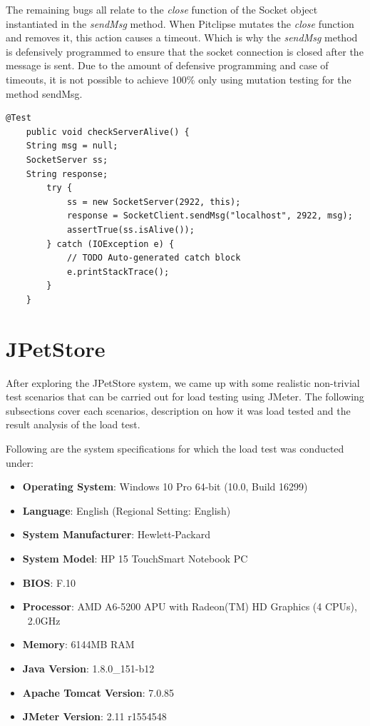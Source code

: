 \documentclass[fontsize=12pt,paper=letter,twoside]{scrartcl}
\begin{document}
The remaining bugs all relate to the \emph{close} function of the Socket object instantiated in the \emph{sendMsg} method. When Pitclipse mutates the \emph{close} function and removes it, this action causes a timeout. Which is why the \emph{sendMsg} method is defensively programmed to ensure that the socket connection is closed after the message is sent. Due to the amount of defensive programming and case of timeouts, it is not possible to achieve 100\% only using mutation testing for the method sendMsg.

\begin{lstlisting}[caption={Additional test case for sendMsg},label={list:sendMsg}]
    @Test
    public void checkServerAlive() {
    String msg = null;
    SocketServer ss;
    String response;
        try {
            ss = new SocketServer(2922, this);
            response = SocketClient.sendMsg("localhost", 2922, msg);
            assertTrue(ss.isAlive());
        } catch (IOException e) {
            // TODO Auto-generated catch block
            e.printStackTrace();
        }
    }
\end{lstlisting}

\newpage
\section{JPetStore}

After exploring the JPetStore system, we came up with some realistic non-trivial test scenarios that can be carried out for load testing using JMeter. The following subsections cover each scenarios, description on how it was load tested and the result analysis of the load test.

\bigskip
\noindent Following are the system specifications for which the load test was conducted under:
\begin{itemize}
\item \textbf{Operating System}: Windows 10 Pro 64-bit (10.0, Build 16299)
\item \textbf{Language}: English (Regional Setting: English)
\item \textbf{System Manufacturer}: Hewlett-Packard
\item \textbf{System Model}: HP 15 TouchSmart Notebook PC
\item \textbf{BIOS}: F.10
\item \textbf{Processor}: AMD A6-5200 APU with Radeon(TM) HD Graphics (4 CPUs), ~2.0GHz
\item \textbf{Memory}: 6144MB RAM
\item \textbf{Java Version}: 1.8.0\_151-b12
\item \textbf{Apache Tomcat Version}: 7.0.85
\item \textbf{JMeter Version}: 2.11 r1554548
\end{itemize}
\end{document}
